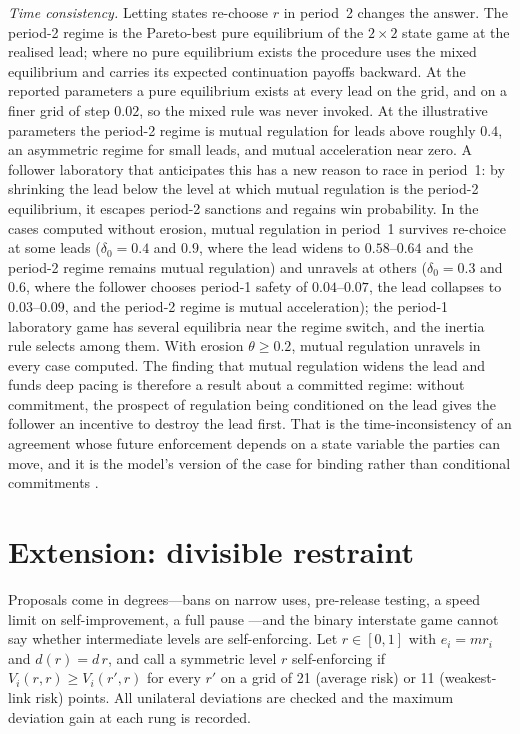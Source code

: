 \documentclass[11pt]{article}
\theoremstyle{plain}
\theoremstyle{definition}
\theoremstyle{remark}
\begin{document}
\emph{Time consistency.} Letting states re-choose $r$ in period~2 changes the answer. The period-2 regime is the Pareto-best pure equilibrium of the $2\times2$ state game at the realised lead; where no pure equilibrium exists the procedure uses the mixed equilibrium and carries its expected continuation payoffs backward. At the reported parameters a pure equilibrium exists at every lead on the grid, and on a finer grid of step $0.02$, so the mixed rule was never invoked. At the illustrative parameters the period-2 regime is mutual regulation for leads above roughly $0.4$, an asymmetric regime for small leads, and mutual acceleration near zero. A follower laboratory that anticipates this has a new reason to race in period~1: by shrinking the lead below the level at which mutual regulation is the period-2 equilibrium, it escapes period-2 sanctions and regains win probability. In the cases computed without erosion, mutual regulation in period~1 survives re-choice at some leads ($\delta_0=0.4$ and $0.9$, where the lead widens to $0.58$--$0.64$ and the period-2 regime remains mutual regulation) and unravels at others ($\delta_0=0.3$ and $0.6$, where the follower chooses period-1 safety of $0.04$--$0.07$, the lead collapses to $0.03$--$0.09$, and the period-2 regime is mutual acceleration); the period-1 laboratory game has several equilibria near the regime switch, and the inertia rule selects among them. With erosion $\theta\ge0.2$, mutual regulation unravels in every case computed. The finding that mutual regulation widens the lead and funds deep pacing is therefore a result about a committed regime: without commitment, the prospect of regulation being conditioned on the lead gives the follower an incentive to destroy the lead first. That is the time-inconsistency of an agreement whose future enforcement depends on a state variable the parties can move, and it is the model's version of the case for binding rather than conditional commitments \citep{schelling1960}.

\section{Extension: divisible restraint}

Proposals come in degrees---bans on narrow uses, pre-release testing, a speed limit on self-improvement, a full pause \citep{amodei2026}---and the binary interstate game cannot say whether intermediate levels are self-enforcing. Let $r\in[0,1]$ with $e_i=mr_i$ and $d(r)=d\,r$, and call a symmetric level $r$ self-enforcing if $V_i(r,r)\ge V_i(r',r)$ for every $r'$ on a grid of 21 (average risk) or 11 (weakest-link risk) points. All unilateral deviations are checked and the maximum deviation gain at each rung is recorded.
\end{document}
